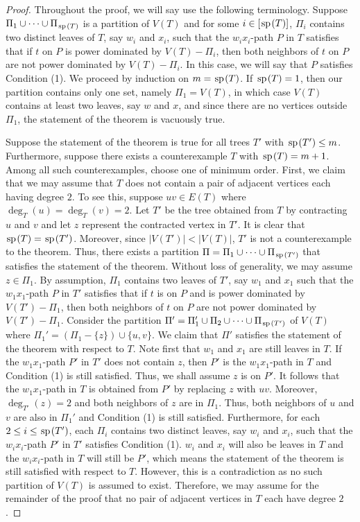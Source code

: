 \documentclass[11pt]{article}
\newcommand{\spider}{\hskip1pt \textrm{sp} \hskip1pt}
\begin{document}
\begin{proof} Throughout the proof, we will say use the following terminology. Suppose $\Pi_1 \cup  \cdots \cup \Pi_{\spider(T)}$ is a partition of $V(T)$ and for some $i\in [\spider(T)]$, $\Pi_i$ contains two distinct leaves of $T$, say $w_i$ and $x_i$, such that the  $w_ix_i$-path $P$ in $T$ satisfies that if $t$ on $P$ is power dominated by $V(T) - \Pi_i$, then both neighbors of $t$ on $P$ are not power dominated by $V(T) - \Pi_i$. In this case, we will say that $P$ satisfies Condition (1).  We proceed by induction on $m=\spider(T)$. If $\spider(T) = 1$, then our partition contains only one set, namely $\Pi_1 =V(T)$, in which case $V(T)$ contains at least two leaves, say $w$ and $x$, and since there are no vertices outside $\Pi_1$, the statement of the theorem is vacuously true. 

Suppose the statement of the theorem is true for all trees $T'$ with $\spider(T') \le m$. Furthermore, suppose there exists a counterexample $T$ with $\spider(T) = m+1$. Among all such counterexamples, choose one of minimum order. First, we claim that we may assume that $T$ does not contain a pair of adjacent vertices each having degree $2$. To see this, suppose $uv \in E(T)$ where $\deg_T(u) = \deg_T(v) = 2$. Let $T'$ be the tree obtained from $T$ by contracting $u$ and $v$ and let $z$ represent the contracted vertex in $T'$. It is clear that $\spider(T) = \spider(T')$. Moreover, since $|V(T')| < |V(T)|$, $T'$ is not a counterexample to the theorem. Thus, there exists a partition $\Pi = \Pi_1 \cup \cdots \cup \Pi_{\spider(T')}$ that satisfies the statement of the theorem. Without loss of generality, we may assume $z \in \Pi_1$. By assumption, $\Pi_1$ contains two leaves of $T'$, say $w_1$ and $x_1$ such that the $w_1x_1$-path $P$ in $T'$ satisfies that if $t$ is on $P$ and is power dominated by $V(T') - \Pi_1$, then both neighbors of $t$ on $P$ are not power dominated by $V(T') - \Pi_1$. Consider the partition $\Pi' = \Pi_1' \cup \Pi_2 \cup \cdots \cup \Pi_{\spider(T')}$ of $V(T)$ where $\Pi_1' = (\Pi_1 - \{z\}) \cup \{u,v\}$. We claim that $\Pi'$ satisfies the statement of the theorem with respect to $T$. Note first that $w_1$ and $x_1$ are still leaves in $T$. If the $w_1x_1$-path $P'$ in $T'$ does not contain $z$, then $P'$ is the $w_1x_1$-path in $T$ and Condition (1) is still satisfied. Thus, we shall assume $z$ is on $P'$. It follows that the $w_1x_1$-path in $T$ is obtained from $P'$ by replacing $z$ with $uv$. Moreover, $\deg_{T'}(z) = 2$ and both neighbors of $z$ are in $\Pi_1$. Thus, both neighbors of $u$ and $v$ are also in $\Pi_1'$ and Condition (1) is still satisfied. Furthermore, for each $2 \le i \le \spider(T')$, each $\Pi_i$ contains two distinct leaves, say $w_i$ and $x_i$, such that the $w_ix_i$-path $P'$ in $T'$ satisfies Condition (1). $w_i$ and $x_i$ will also be leaves in $T$ and the $w_ix_i$-path in $T$ will still be $P'$, which means the statement of the theorem is still satisfied with respect to $T$. However, this is a contradiction as no such partition of $V(T)$ is assumed to exist. Therefore, we may assume for the remainder of the proof that no pair of adjacent vertices in $T$ each have degree $2$. 


\end{proof}
\end{document}
